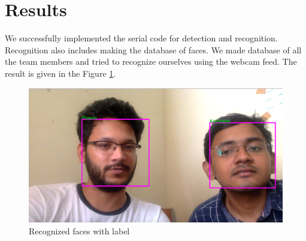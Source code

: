 \documentclass[conference]{IEEEtran}
\begin{document}
\section{Results}
We successfully implemented the serial code for detection and recognition. Recognition also includes making the database of faces. We made database of all the team members and tried to recognize ourselves using the webcam feed. The result is given in the Figure \ref{res}.
\begin{figure}[h!]
	\centering
	\includegraphics[scale=0.2]{./images/res.png}
	\caption{Recognized faces with label}
	\label{res}
\end{figure}
\end{document}
